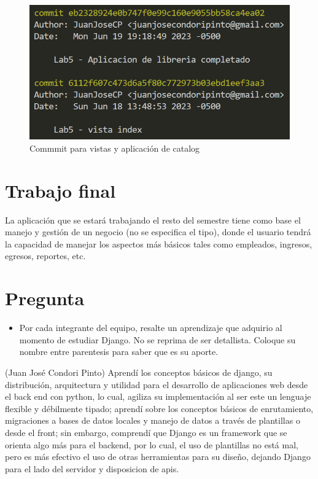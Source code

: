\documentclass{article}
\begin{document}
    \begin{figure}[H]
        \centering
        \includegraphics[scale=0.42]{img/img11_commit.png}
        \caption{Commmit para vistas y aplicación de catalog}
        \label{fig:imagen}
    \end{figure}

    \section{Trabajo final}
        La aplicación que se estará trabajando el resto del semestre tiene como base el manejo y gestión de un negocio (no se especifica el tipo), donde el usuario tendrá la capacidad de manejar los aspectos más básicos tales como empleados, ingresos, egresos, reportes, etc.

    \section{Pregunta}
        \begin{itemize}
            \item Por cada integrante del equipo, resalte un aprendizaje que adquirio al momento de estudiar Django. No se reprima de ser detallista. Coloque su nombre entre parentesis para saber que es su aporte.
        \end{itemize}
        (Juan José Condori Pinto) Aprendí los conceptos básicos de django, su distribución, arquitectura y utilidad para el desarrollo de aplicaciones web desde el back end con python, lo cual, agiliza su implementación al ser este un lenguaje flexible y débilmente tipado; aprendí sobre los conceptos básicos de enrutamiento, migraciones a bases de datos locales y manejo de datos a través de plantillas o desde el front; sin embargo, comprendí que Django es un framework que se orienta algo más para el backend, por lo cual, el uso de plantillas no está mal, pero es más efectivo el uso de otras herramientas para su diseño, dejando Django para el lado del servidor y disposicion de apis.
        
\end{document}
